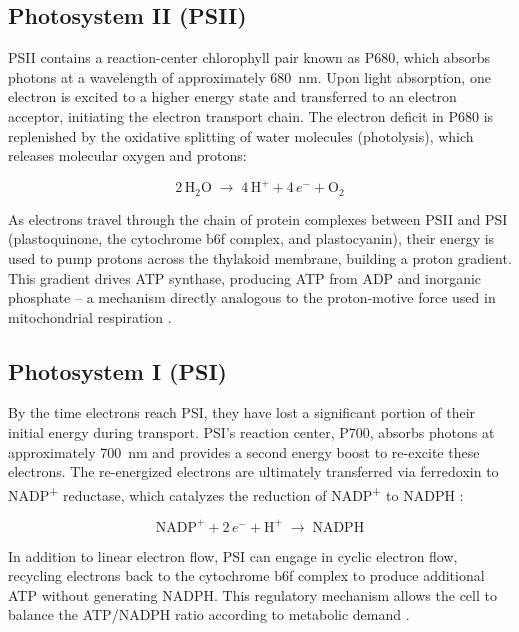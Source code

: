 \documentclass[conference]{IEEEtran}
\begin{document}
\subsection{Photosystem II (PSII)}
PSII contains a reaction-center chlorophyll pair known as P680, which absorbs photons at a wavelength of approximately 680~nm. Upon light absorption, one electron is excited to a higher energy state and transferred to an electron acceptor, initiating the electron transport chain. The electron deficit in P680 is replenished by the oxidative splitting of water molecules (photolysis), which releases molecular oxygen and protons:

\begin{equation}
2\,\text{H}_2\text{O} \;\longrightarrow\; 4\,\text{H}^+ + 4\,e^- + \text{O}_2
\end{equation}

As electrons travel through the chain of protein complexes between PSII and PSI (plastoquinone, the cytochrome b6f complex, and plastocyanin), their energy is used to pump protons across the thylakoid membrane, building a proton gradient. This gradient drives ATP synthase, producing ATP from ADP and inorganic phosphate -- a mechanism directly analogous to the proton-motive force used in mitochondrial respiration \cite{slcc_etc}.

\subsection{Photosystem I (PSI)}
By the time electrons reach PSI, they have lost a significant portion of their initial energy during transport. PSI's reaction center, P700, absorbs photons at approximately 700~nm and provides a second energy boost to re-excite these electrons. The re-energized electrons are ultimately transferred via ferredoxin to NADP\textsuperscript{+} reductase, which catalyzes the reduction of NADP\textsuperscript{+} to NADPH \cite{libretexts_general, libretexts_openStax}:

\begin{equation}
\text{NADP}^+ + 2\,e^- + \text{H}^+ \;\longrightarrow\; \text{NADPH}
\end{equation}

In addition to linear electron flow, PSI can engage in cyclic electron flow, recycling electrons back to the cytochrome b6f complex to produce additional ATP without generating NADPH. This regulatory mechanism allows the cell to balance the ATP/NADPH ratio according to metabolic demand \cite{wikipedia_ldr}.
\end{document}
